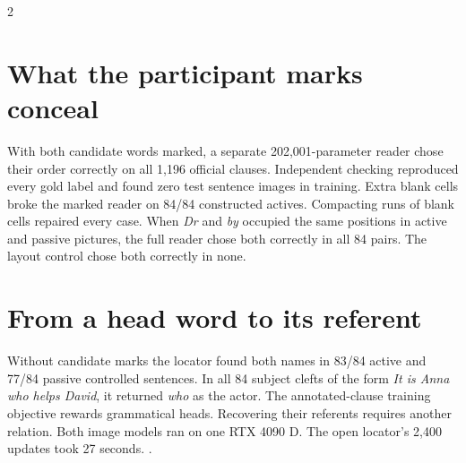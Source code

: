 \begin{multicols}{2}
\section*{What the participant marks conceal}
With both candidate words marked, a separate 202,001-parameter reader chose their order correctly on all 1,196 official clauses. Independent checking reproduced every gold label and found zero test sentence images in training. Extra blank cells broke the marked reader on 84/84 constructed actives. Compacting runs of blank cells repaired every case. When \emph{Dr} and \emph{by} occupied the same positions in active and passive pictures, the full reader chose both correctly in all 84 pairs. The layout control chose both correctly in none.
\section*{From a head word to its referent}
Without candidate marks the locator found both names in 83/84 active and 77/84 passive controlled sentences. In all 84 subject clefts of the form \emph{It is Anna who helps David}, it returned \emph{who} as the actor. The annotated-clause training objective rewards grammatical heads. Recovering their referents requires another relation. Both image models ran on one RTX 4090 D. The open locator's 2,400 updates took 27 seconds. .
\end{multicols}
